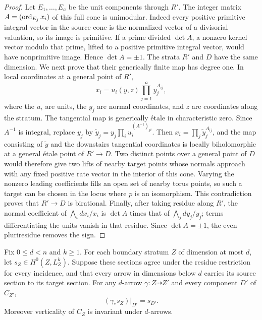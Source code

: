 \begin{proof}
Let \(E_1,\ldots,E_a\) be the unit components through \(R'\).
The integer matrix \(A=(\operatorname{ord}_{E_j}x_i)\) of this full cone is unimodular.
Indeed every positive
primitive integral vector in the source cone is the normalized vector of
a divisorial valuation, so its image is primitive.  If a prime divided
\(\det A\), a nonzero kernel vector modulo that prime, lifted to a
positive primitive integral vector, would have nonprimitive image.  Hence
\(\det A=\pm1\).  The strata \(R'\) and \(D\) have the same dimension.
We next prove that their generically finite map has degree one.  In local coordinates at a
general point of \(R'\),
\[
 x_i=u_i(y,z)\prod_{j=1}^a y_j^{A_{ij}},
\]
where the \(u_i\) are units, the \(y_j\) are normal coordinates, and
\(z\) are coordinates along the stratum.  The tangential map is
generically \'etale in characteristic zero.  Since \(A^{-1}\) is integral,
replace \(y_j\) by
\(\widetilde y_j=y_j\prod_i u_i^{(A^{-1})_{ji}}\).  Then
\(x_i=\prod_j\widetilde y_j^{A_{ij}}\), and the map consisting of
\(\widetilde y\) and the downstairs tangential coordinates is locally
biholomorphic at a general \'etale point of \(R'\to D\).  Two distinct
points over a general point of \(D\) would therefore give two lifts of
nearby target points whose normals approach with any fixed positive rate
vector in the interior of this cone.  Varying the nonzero leading
coefficients fills an open set of nearby torus points, so such a target can
be chosen in the locus where \(p\) is an isomorphism.  This contradiction
proves that \(R'\to D\) is birational.  Finally, after taking residue
along \(R'\), the normal coefficient of
\(\bigwedge_i dx_i/x_i\) is \(\det A\) times that of
\(\bigwedge_jdy_j/y_j\); terms differentiating the units vanish in that
residue.  Since \(\det A=\pm1\), the even pluriresidue removes the sign.
\end{proof}

\begin{lemma}\label{floor:transport}
Fix \(0\leq d<n\) and \(k\geq1\).  For each boundary stratum \(Z\) of
dimension at most \(d\), let \(s_Z\in H^0(Z,L_Z^k)\).  Suppose these
sections agree under the residue restriction for every incidence, and that
every arrow in dimensions below \(d\) carries its source section to its
target section.  For any \(d\)-arrow \(\gamma:Z\dashrightarrow Z'\) and
every component \(D'\) of \(C_{Z'}\),
\[
 (\gamma_*s_Z)|_{D'}=s_{D'}.
\]
Moreover verticality of \(C_Z\) is invariant under \(d\)-arrows.
\end{lemma}

